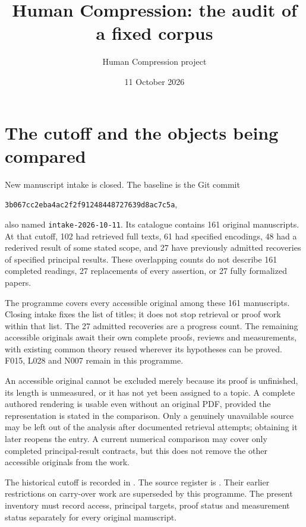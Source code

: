 \documentclass[11pt,a4paper]{article}
\title{Human Compression: the audit of a fixed corpus}
\author{Human Compression project}
\date{11 October 2026}
\begin{document}
\maketitle

\section{The cutoff and the objects being compared}

New manuscript intake is closed. The baseline is the Git commit
\begin{center}\texttt{3b067cc2eba4ac2f2f91248448727639d8ac7c5a},\end{center}
also named \texttt{intake-2026-10-11}. Its catalogue contains 161 original
manuscripts. At that cutoff, 102 had retrieved full texts, 61 had specified encodings, 48 had a
rederived result of some stated scope, and 27 have previously admitted
recoveries of specified principal results. These overlapping counts do
not describe 161 completed readings, 27 replacements of every assertion,
or 27 fully formalized papers.

The programme covers every accessible original among these 161 manuscripts.
Closing intake fixes the list of titles; it does not stop retrieval or proof
work within that list. The 27 admitted recoveries are a progress count.
The remaining accessible originals await their own complete proofs,
reviews and measurements, with existing common theory reused wherever its
hypotheses can be proved. F015, L028 and N007 remain in this programme.

An accessible original cannot be excluded merely because its proof is
unfinished, its length is unmeasured, or it has not yet been assigned to a
topic. A complete authored rendering is usable even without an original
PDF, provided the representation is stated in the comparison. Only a
genuinely unavailable source may be left out of the analysis after documented
retrieval attempts; obtaining it later reopens the entry. A current numerical
comparison may cover only completed principal-result contracts, but this
does not remove the other accessible originals from the work.

The historical cutoff is recorded in .
The source register is .
Their earlier restrictions on
carry-over work are superseded by this programme. The present inventory
must record access, principal targets, proof status and measurement status
separately for every original manuscript.
\end{document}

